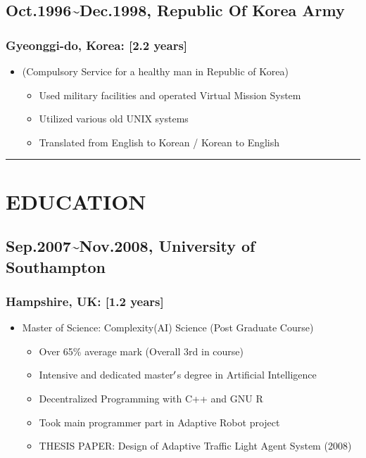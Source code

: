 \documentclass[12pt,a4paper]{article}
\begin{document}
\subsection{Oct.1996{\textasciitilde}Dec.1998, Republic Of Korea Army}
\subsubsection{Gyeonggi-do, Korea: [2.2 years]}
\begin{itemize}
\item (Compulsory Service for a healthy man in Republic of Korea)

\begin{itemize}
\item Used military facilities and operated Virtual Mission System


\item Utilized various old UNIX systems


\item Translated from English to Korean / Korean to English

\end{itemize}
\end{itemize}
\rule{\textwidth}{1pt}
\section{EDUCATION}
\subsection{Sep.2007{\textasciitilde}Nov.2008, University of Southampton}
\subsubsection{Hampshire, UK: [1.2 years]}
\begin{itemize}
\item Master of Science: Complexity(AI) Science (Post Graduate Course)

\begin{itemize}
\item Over 65\% average mark (Overall 3rd in course)


\item Intensive and dedicated master\ensuremath{\rq}s degree in Artificial Intelligence


\item Decentralized Programming with C++ and GNU R


\item Took main programmer part in Adaptive Robot project


\item THESIS PAPER: Design of Adaptive Traffic Light Agent System (2008)

\end{itemize}
\end{itemize}
\end{document}
